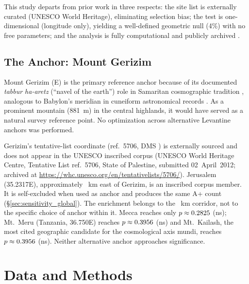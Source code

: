 \documentclass[HARVARD,twocolumn]{USG}
\begin{document}
This study departs from prior work in three respects: the site list
is externally curated (UNESCO World Heritage), eliminating selection
bias; the test is one-dimensional (longitude only), yielding a
well-defined geometric null (4\%) with no free parameters; and
the analysis is fully computational and publicly archived \citep{tenenbaum2026audit}.



\subsection{The Anchor: Mount Gerizim}
\label{sec:anchor}

Mount Gerizim (\GerizimLon\textdegree{}E) is the primary reference
anchor because of its documented \textit{tabbur ha-aretz} (``navel of the
earth'') role in Samaritan cosmographic tradition
\citep{purvis1968,macdonald1964,crown1989}, analogous to Babylon's meridian
in cuneiform astronomical records \citep{hunger2019mul}. As a prominent
mountain (881~m) in the central highlands, it would have served as a
natural survey reference point. No optimization
across alternative Levantine anchors was performed.

Gerizim's tentative-list coordinate (ref.~5706, DMS \GerizimLonDMS{}) is
externally sourced and does not appear in the UNESCO inscribed corpus
(UNESCO World Heritage Centre, Tentative List ref.~5706, State of Palestine,
submitted 02~April~2012; archived at
\url{https://whc.unesco.org/en/tentativelists/5706/}).
Jerusalem (35.2317\textdegree{}E), approximately \GerizimJerusalemKm~km east
of Gerizim, is an inscribed corpus member. It is self-excluded when used as
anchor and produces the same A+ count (\S\ref{sec:sensitivity_global}).
The enrichment belongs to the \GerizimJerusalemKm~km corridor, not to the
specific choice of anchor within it.
Mecca reaches only $p \approx 0.2825$ (ns);
Mt.\ Meru (Tanzania, 36.750\textdegree{}E) reaches $p \approx 0.3956$ (ns)
and Mt.\ Kailash, the most cited geographic candidate for the cosmological
axis mundi, reaches $p \approx 0.3956$ (ns).
Neither alternative anchor approaches significance.


\section{Data and Methods}
\label{sec:methods}
\end{document}
